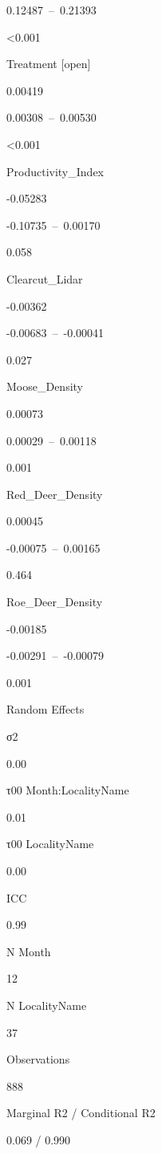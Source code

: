 \documentclass[]{article}
\begin{document}
0.12487~--~0.21393

\textless{}0.001

Treatment {[}open{]}

0.00419

0.00308~--~0.00530

\textless{}0.001

Productivity\_Index

-0.05283

-0.10735~--~0.00170

0.058

Clearcut\_Lidar

-0.00362

-0.00683~--~-0.00041

0.027

Moose\_Density

0.00073

0.00029~--~0.00118

0.001

Red\_Deer\_Density

0.00045

-0.00075~--~0.00165

0.464

Roe\_Deer\_Density

-0.00185

-0.00291~--~-0.00079

0.001

Random Effects

σ2

0.00

τ00 Month:LocalityName

0.01

τ00 LocalityName

0.00

ICC

0.99

N Month

12

N LocalityName

37

Observations

888

Marginal R2 / Conditional R2

0.069 / 0.990
\end{document}
